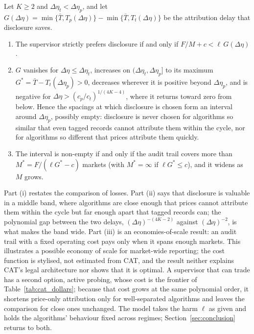\begin{proposition}\label{prop:choice}
Let $K\ge2$ and $\Delta\eta_t<\Delta\eta_p$, and let $G(\Delta\eta)=\min\{\bar T,T_p(\Delta\eta)\}-\min\{\bar T,T_t(\Delta\eta)\}$ be the attribution delay that disclosure saves.
\begin{enumerate}[label=(\roman*),itemsep=1pt]
\item The supervisor strictly prefers disclosure if and only if $F/M+c<\ell\,G(\Delta\eta)$.
\item $G$ vanishes for $\Delta\eta\le\Delta\eta_t$, increases on $(\Delta\eta_t,\Delta\eta_p]$ to its maximum $G^*=\bar T-T_t(\Delta\eta_p)>0$, decreases wherever it is positive beyond $\Delta\eta_p$, and is negative for $\Delta\eta>(c_p/c_t)^{1/(4K-4)}$, where it returns toward zero from below. Hence the spacings at which disclosure is chosen form an interval around $\Delta\eta_p$, possibly empty: disclosure is never chosen for algorithms so similar that even tagged records cannot attribute them within the cycle, nor for algorithms so different that prices attribute them quickly.
\item The interval is non-empty if and only if the audit trail covers more than $M^*=F/(\ell G^*-c)$ markets (with $M^*=\infty$ if $\ell G^*\le c$), and it widens as $M$ grows.
\end{enumerate}
\end{proposition}

Part (i) restates the comparison of losses. Part (ii) says that disclosure is valuable in a middle band, where algorithms are close enough that prices cannot attribute them within the cycle but far enough apart that tagged records can; the polynomial gap between the two delays, $(\Delta\eta)^{-(4K-2)}$ against $(\Delta\eta)^{-2}$, is what makes the band wide. Part (iii) is an economies-of-scale result: an audit trail with a fixed operating cost pays only when it spans enough markets. This illustrates a possible economy of scale for market-wide reporting; the cost function is stylised, not estimated from CAT, and the result neither explains CAT's legal architecture nor shows that it is optimal. A supervisor that can trade has a second option, active probing, whose cost is the frontier of Table~\ref{tab:cat_dollars}; because that cost grows at the same polynomial order, it shortens price-only attribution only for well-separated algorithms and leaves the comparison for close ones unchanged. The model takes the harm $\ell$ as given and holds the algorithms' behaviour fixed across regimes; Section~\ref{sec:conclusion} returns to both.

